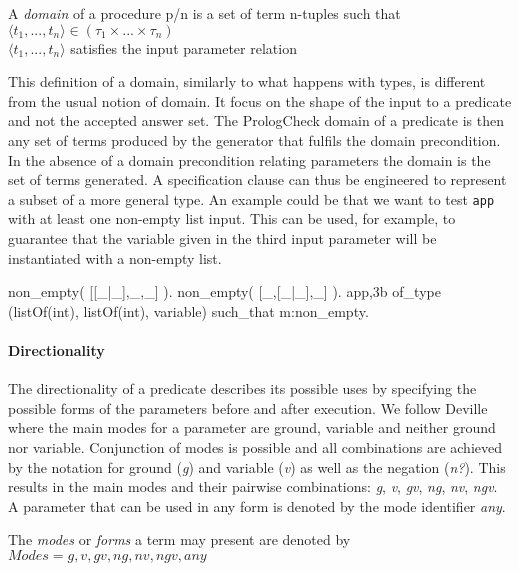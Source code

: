 \documentclass[runningheads,a4paper]{llncs}
\newcommand{\yap}[1]{\lstinline[style=yap]{#1}}
\newcommand{\plqc}[0]{{\sf PrologCheck}}
\begin{document}
\begin{definition}
\label{def:domain}
A {\em domain} of a procedure p/n is a set of term
n-tuples such that\\
\qquad $\langle t_1,...,t_n \rangle \in (\tau_1 \times ... \times
\tau_n)$\\
\qquad $\langle t_1,...,t_n \rangle$ satisfies the input parameter relation
\end{definition}


This definition of a domain, similarly to what happens with types, is
different from the usual notion of domain.
%
It focus on the shape of the input to a predicate and not the accepted
answer set.
%
The \plqc{} domain of a predicate is then any set of terms produced by
the generator that fulfils the domain precondition.
%
In the absence of a domain precondition relating parameters the domain
is the set of terms generated.
%
A specification clause can thus be engineered to represent a subset of
a more general type.
%
An example could be that we want to test \yap{app} with at least one
non-empty list input.
%
This can be used, for example, to guarantee that the variable given in
the third input parameter will be instantiated with a non-empty list.
\begin{yapcode}
 non_empty( [[_|_],_,_] ).
 non_empty( [_,[_|_],_] ).
 {app,3b} of_type (listOf(int), listOf(int), variable)
    such_that m:non_empty.
\end{yapcode}



\paragraph{\bf Directionality}

The directionality of a predicate describes its possible uses by
specifying the possible forms of the parameters before and after
execution.
%
We follow Deville~\cite{Deville1990logprog} where the main modes for a
parameter are ground, variable and neither ground
nor variable.
%
Conjunction of modes is possible and all combinations are achieved
by the notation for ground (\emph{g}) and variable (\emph{v}) as well as
the negation (\emph{n?}).
%
This results in the main modes and their pairwise combinations: \emph{g},
\emph{v}, \emph{gv},  \emph{ng}, \emph{nv}, \emph{ngv}.
%
A parameter that can be used in any form is denoted by the mode
identifier \emph{any}.


\begin{definition}
\label{def:modes}
The \emph{modes} or \emph{forms} a term may present are denoted by\\
 $Modes = {g, v, gv, ng, nv, ngv, any}$
\end{definition}
\end{document}
